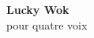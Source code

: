 \documentclass[a4paper]{book}
\begin{document}
\begin{titlepage}
\begin{flushright}
{\Huge \bfseries Lucky Wok \\ }
{\large pour quatre voix \\}
\par
{}
\end{flushright}
\end{titlepage}
\thispagestyle{empty} 
\frontmatter
\clearpage
\end{document}
